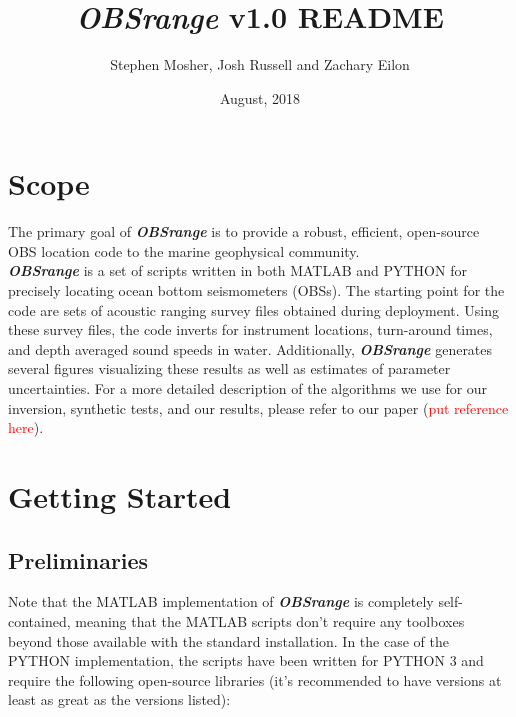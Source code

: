\documentclass[titlepage, 12pt]{article}
\begin{document}
 \title{\textbf{\textit{\textit{\textbf{OBSrange}}}} v1.0 README}
 \author{Stephen Mosher, Josh Russell and Zachary Eilon}
 \date{August, 2018}
 \maketitle{}

 \tableofcontents
 \newpage

 \section{Scope}
   The primary goal of \textit{\textbf{OBSrange}} is to provide a robust, efficient, open-source OBS location code to the marine geophysical community.\\ 

   \textit{\textbf{OBSrange}} is a set of scripts written in both MATLAB and PYTHON for precisely locating ocean bottom seismometers (OBSs). The starting point for the code are sets of acoustic ranging survey files obtained during deployment. Using these survey files, the code inverts for instrument locations, turn-around times, and depth averaged sound speeds in water. Additionally, \textit{\textbf{OBSrange}} generates several figures visualizing these results as well as estimates of parameter uncertainties. For a more detailed description of the algorithms we use for our inversion, synthetic tests, and our results, please refer to our paper (\textcolor{red}{put reference here}).

 \section{Getting Started}
  
  \subsection{Preliminaries}
  Note that the MATLAB implementation of \textit{\textbf{OBSrange}} is completely self-contained, meaning that the MATLAB scripts don’t require any toolboxes beyond those available with the standard installation. In the case of the PYTHON implementation, the scripts have been written for PYTHON 3 and require the following open-source libraries (it’s recommended to have versions at least as great as the versions listed):
\end{document}
